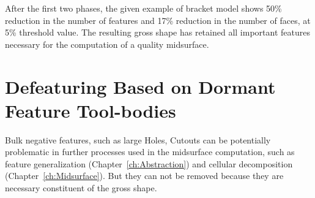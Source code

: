 \begin{minipage}[t]{\linewidth}
\begin{tabular}[h]{@{} p{0.3\linewidth} | p{0.3\linewidth} |  p{0.3\linewidth}@{}}
\end{tabular}
\label{fig:defeaturing:phaseII}
\end{minipage}












After the first two phases, the given example of bracket model shows 50\% reduction in the number of features and 17\% reduction in the number of faces, at 5\% threshold value. The resulting gross shape has retained all important features necessary for the computation of a quality midsurface.

\section{Defeaturing Based on Dormant Feature Tool-bodies}\label{sec:defeature:dormant}


Bulk negative features, such as large Holes, Cutouts can be potentially problematic in further processes used in the midsurface computation, such as feature generalization (Chapter~\ref{ch:Abstraction}) and cellular decomposition (Chapter~\ref{ch:Midsurface}). But they can not be removed because they are necessary constituent of the gross shape. 


